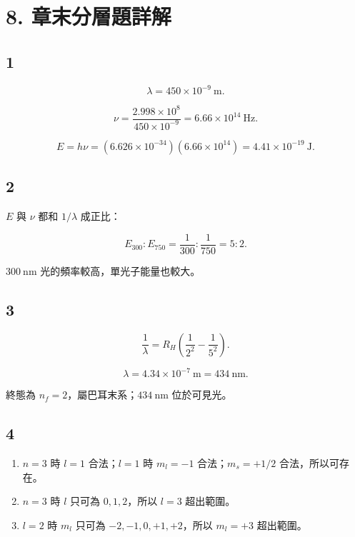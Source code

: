 \documentclass[11pt,a4paper]{article}
\providecommand{\tightlist}{%
  \setlength{\itemsep}{0pt}\setlength{\parskip}{0pt}}
\begin{document}
\section{8. 章末分層題詳解}\label{ux7ae0ux672bux5206ux5c64ux984cux8a73ux89e3}

\subsection{1}\label{section}

\[
\lambda=450\times10^{-9}\ \mathrm m.
\]

\[
\nu=\frac{2.998\times10^8}{450\times10^{-9}}
=6.66\times10^{14}\ \mathrm{Hz}.
\]

\[
E=h\nu
=(6.626\times10^{-34})(6.66\times10^{14})
=4.41\times10^{-19}\ \mathrm J.
\]

\subsection{2}\label{section-1}

\(E\) 與 \(\nu\) 都和 \(1/\lambda\) 成正比：

\[
E_{300}:E_{750}
=\frac1{300}:\frac1{750}
=5:2.
\]

\(300\ \mathrm{nm}\) 光的頻率較高，單光子能量也較大。

\subsection{3}\label{section-2}

\[
\frac1\lambda
=R_H\left(\frac1{2^2}-\frac1{5^2}\right).
\]

\[
\lambda=4.34\times10^{-7}\ \mathrm m=434\ \mathrm{nm}.
\]

終態為 \(n_f=2\)，屬巴耳末系；\(434\ \mathrm{nm}\) 位於可見光。

\subsection{4}\label{section-3}

\begin{enumerate}
\def\labelenumi{\arabic{enumi}.}
\tightlist
\item
  \(n=3\) 時 \(l=1\) 合法；\(l=1\) 時 \(m_l=-1\) 合法；\(m_s=+1/2\) 合法，所以可存在。
\item
  \(n=3\) 時 \(l\) 只可為 \(0,1,2\)，所以 \(l=3\) 超出範圍。
\item
  \(l=2\) 時 \(m_l\) 只可為 \(-2,-1,0,+1,+2\)，所以 \(m_l=+3\) 超出範圍。
\end{enumerate}
\end{document}
